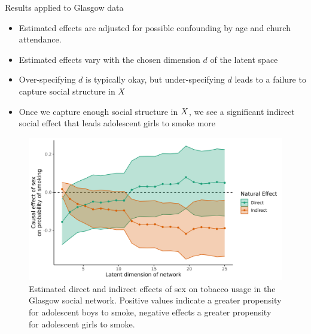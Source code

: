\documentclass[final]{beamer}
\newlength{\colwidth}
\begin{document}
\begin{frame}[t]
\begin{columns}[t]
\begin{column}{\colwidth}
\begin{block}{Results applied to Glasgow data}
                \begin{minipage}{.4\textwidth}

                    \begin{itemize}
                        \item Estimated effects are adjusted for possible confounding by age and church attendance.
                        \item Estimated effects vary with the chosen dimension $d$ of the latent space
                        \item Over-specifying $d$ is typically okay, but under-specifying $d$ leads to a failure to capture social structure in $X$
                        \item Once we capture enough social structure in $X$, we see a significant indirect social effect that leads adolescent girls to smoke more
                    \end{itemize}

                \end{minipage}
                \begin{minipage}{.6\textwidth}

                    \begin{figure}[ht!]
                        \centering
                        \includegraphics[width=\textwidth]{figures/glasgow/effects.png}
                        \caption{Estimated direct and indirect effects of sex on tobacco usage in the Glasgow social network. Positive values indicate a greater propensity for adolescent boys to smoke, negative effects a greater propensity for adolescent girls to smoke.}
                        \label{fig:glasgow-estimates}
                    \end{figure}

                \end{minipage}


\end{block}
\end{column}
\end{columns}
\end{frame}
\end{document}
